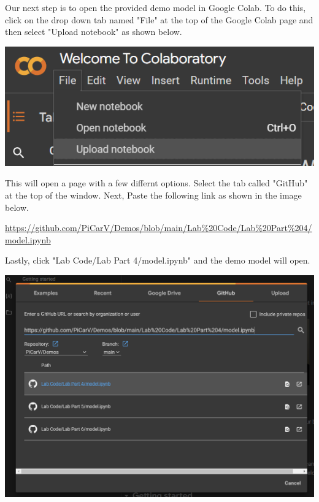 \documentclass[11pt]{report}
\begin{document}
Our next step is to open the provided demo model in Google Colab. To do this, click on the drop down tab named "File" at the top of the Google Colab page and then select "Upload notebook" as shown below.

\begin{center}
    \includegraphics[scale=0.6]{creataproject.png}
\end{center}

This will open a page with a few differnt options. Select the tab called "GitHub" at the top of the window. Next, Paste the following link as shown in the image below.\newline

\url{https://github.com/PiCarV/Demos/blob/main/Lab%20Code/Lab%20Part%204/model.ipynb} \newline

Lastly, click "Lab Code/Lab Part 4/model.ipynb" and the demo model will open.

\begin{center}
    \includegraphics[scale=0.3]{openmodel.png}
\end{center}
\end{document}
